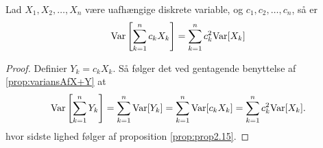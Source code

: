 \begin{cor} \label{cor:variansAfLinearKombinationAfUafhængigeVariable}
  Lad $X_{1}, X_{2}, \ldots, X_{n}$ være uafhængige diskrete variable, og $c_{1}, c_{2}, \ldots, c_{n}$, så er
  \begin{equation*}
    \textnormal{Var}\left[\sum^{n}_{k = 1} c_{k}X_{k}\right] = \sum_{k=1}^n c_{k}^{2} \textnormal{Var}[X_{k}]
  \end{equation*}
\end{cor}
\begin{proof}
  Definier $Y_{k} = c_{k}X_{k}$. Så følger det ved gentagende benyttelse af
  \ref{prop:variansAfX+Y} at
  \begin{equation*}
    \textnormal{Var}\left[\sum_{k=1}^n Y_{k}\right] = \sum_{k=1}^n \textnormal{Var}[Y_{k}] = \sum_{k=1}^n \textnormal{Var}[c_{k}X_{k}] = \sum_{k=1}^n c_{k}^{2}\textnormal{Var}[X_{k}].
  \end{equation*}
  hvor sidste lighed følger af proposition \ref{prop:prop2.15}.
\end{proof}
